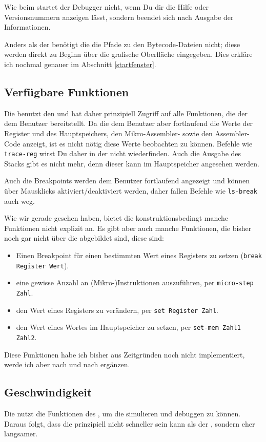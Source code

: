 Wie beim \md{} startet der Debugger nicht, wenn Du dir die Hilfe oder Versionsnummern anzeigen lässt, sondern beendet sich nach Ausgabe der Informationen.

Anders als der \md{} benötigt die \mdg{} die Pfade zu den Bytecode-Dateien nicht; diese werden direkt zu Beginn über die grafische Oberfläche eingegeben. Dies erkläre ich nochmal genauer im Abschnitt \ref{startfenster}.

\subsection{Verfügbare Funktionen}
Die \mdg{} benutzt den \md{} und hat daher prinzipiell Zugriff auf alle Funktionen, die der \md{} dem Benutzer bereitstellt. Da die \mdg{} dem Benutzer aber fortlaufend die Werte der Register und des Hauptspeichers, den Mikro-Assembler- sowie den Assembler-Code anzeigt, ist es nicht nötig diese Werte beobachten zu können. Befehle wie \texttt{trace-reg} wirst Du daher in der \mdg{} nicht wiederfinden. Auch die Ausgabe des Stacks gibt es nicht mehr, denn dieser kann im Hauptspeicher angesehen werden.

Auch die Breakpoints werden dem Benutzer fortlaufend angezeigt und können über Mausklicks aktiviert/deaktiviert werden, daher fallen Befehle wie \texttt{ls-break} auch weg.

Wie wir gerade gesehen haben, bietet die \mdg{} konstruktionsbedingt manche Funktionen nicht explizit an. Es gibt aber auch manche Funktionen, die bisher noch gar nicht über die \mdg{} abgebildet sind, diese sind:
\begin{itemize}
\item Einen Breakpoint für einen bestimmten Wert eines Registers zu setzen (\texttt{break Register Wert}).
\item eine gewisse Anzahl an (Mikro-)Instruktionen auszuführen, per \texttt{micro-step Zahl}.
\item den Wert eines Registers zu verändern, per \texttt{set Register Zahl}.
\item den Wert eines Wortes im Hauptspeicher zu setzen, per \texttt{set-mem Zahl1 Zahl2}.
\end{itemize}

Diese Funktionen habe ich bisher aus Zeitgründen noch nicht implementiert, werde ich aber nach und nach ergänzen.

\subsection{Geschwindigkeit}
Die \mdg{} nutzt die Funktionen des \md{}, um die \mic{} simulieren und debuggen zu können. Daraus folgt, dass die \mdg{} prinzipiell nicht schneller sein kann als der \md{}, sondern eher langsamer.

